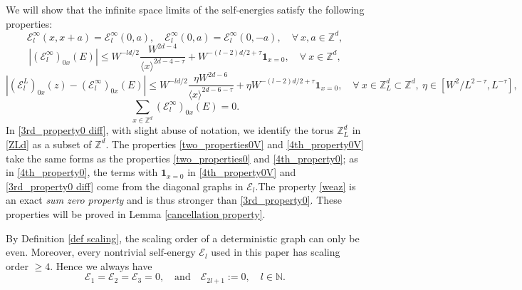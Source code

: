 \documentclass{article}
\newcommand{\1}{\mathds{1}}
\numberwithin{equation}{section}
\newcommand{\be}{\begin{equation}}
\newcommand{\ee}{\end{equation}}
\renewcommand{\leq}{\leqslant}
\renewcommand{\geq}{\geqslant}
\renewcommand{\le}{\leq}
\renewcommand{\ge}{\geq}
\newcommand{\N}{\mathbb{N}}
\newcommand{\Z}{\mathbb{Z}}
\newcommand{\self}{\text{self-energy}}
\newcommand{\selfs}{\text{self-energies}}
\theoremstyle{plain} %
\newtheorem{proposition}[theorem]{Proposition}
\theoremstyle{remark}
\newcommand{\cor}{\color{red}}
\newcommand{\nc}{\normalcolor}
\newcommand{\Sele}{{\mathcal E}}
\newcommand{\Selek}{{\mathcal E}}
\newcommand{\Seleinf}{{\mathcal E}^{\infty}}
\newcommand{\hty}[1]{{\cor (ht: #1) }}
\begin{document}

We will show that the infinite space limits of the $\selfs$ satisfy the following properties: 
%
\be\label{two_properties0V}
\Seleinf_{l}(x, x+a) = \Seleinf_{l}(0,a), \quad  \Seleinf_{l}(0, a) =\Seleinf_{l} (0,-a), \quad \forall \ x,a\in \Z^d,
\ee 
\be\label{4th_property0V}
\left| (\Seleinf_{l})_{0x}(E) \right| \le W^{-ld/2} \frac{W^{2d-4} }{\langle x\rangle^{2d-4-\tau}} + W^{-(l-2)d/2+\tau}\mathbf 1_{x=0}, \quad \forall \ x\in \Z^d,
\ee
\be\label{3rd_property0 diff}
\left| (\Selek^L_{l})_{0x}(z)-(\Seleinf_{l})_{0x}(E) \right| \le W^{-ld/2} \frac{\eta W^{2d-6} }{\langle x\rangle^{2d-6-\tau}} + \eta W^{-(l-2)d/2+\tau}\mathbf 1_{x=0}, \quad \forall \  x\in \Z_L^d \subset \Z^d,\ \eta\in [W^{2}/L^{2-\tau}, L^{-\tau}],
\ee
\begin{equation}\label{weaz}
\sum_{x\in \Z^d} (\Seleinf_{l})_{0x}(E)=0.
\end{equation} 
In \eqref{3rd_property0 diff}, with slight abuse of notation, we identify the torus $\Z_L^d$ in \eqref{ZLd} as a subset of $\Z^d$. The properties \eqref{two_properties0V} and \eqref{4th_property0V} take the same forms as the properties \eqref{two_properties0} and \eqref{4th_property0}; as in \eqref{4th_property0}, the terms with $\mathbf 1_{x=0}$ in \eqref{4th_property0V} and \eqref{3rd_property0 diff} come from the diagonal graphs in $\Sele_l$.The property \eqref{weaz} is an exact \emph{sum zero property} and is thus stronger than \eqref{3rd_property0}. 
These properties will be proved in Lemma \ref{cancellation property}. 

	
By Definition \ref{def scaling}, the scaling order of a deterministic graph can only be even. Moreover, every nontrivial $\self$ $\Selek_{l}$ used in this paper has scaling order $\ge 4$. Hence we always have  %
\be\label{trivial conv}
\Sele_1=\Sele_2=\Sele_3=0, \quad \text{and}\quad \Sele_{2l+1}:=0,\quad l\in \N.
\ee
\end{document}
